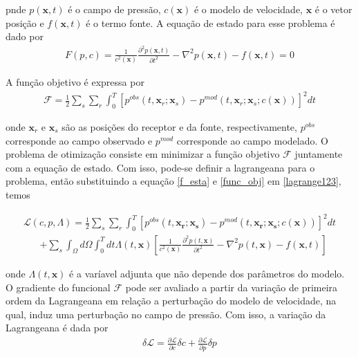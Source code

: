 pnde $p(\mathbf{x},t)$ é o campo de pressão, $c(\mathbf{x})$ é o modelo de velocidade, $\mathbf{x}$ é o vetor posição e $f(\mathbf{x},t)$ é o termo fonte. A equação de estado para esse problema é dado por 
\begin{eqnarray}
\label{f_esta}
 F(p,c) = \frac{1}{c^{2}(\mathbf{x})} \frac{\partial ^{2} p(\mathbf{x},t)}{\partial t^{2}} - \nabla^{2} p(\mathbf{x},t) - f(\mathbf{x},t) = 0
\end{eqnarray}


A função objetivo é expressa por 
\begin{eqnarray}
  \mathcal{F} = \frac{1}{2} \sum_{s} \sum_{r} \int_{0}^{T} \left[ p^{obs} (t,\mathbf{x}_{r};\mathbf{x}_{s}) - p^{mod}(t,\mathbf{x}_{r};\mathbf{x}_{s};c(\mathbf{x})) \right ] ^{2} dt
  \label{func_obj}
\end{eqnarray}

onde $\mathbf{x}_{r}$ e $\mathbf{x}_{s}$ são as posições do receptor e da fonte, respectivamente, $p^{obs}$ corresponde ao campo observado e $p^{mod}$ corresponde ao campo modelado. O problema de otimização consiste em minimizar a função objetivo $\mathcal{F}$ juntamente com a equação de estado. Com isso, pode-se definir a lagrangeana para o problema, então substituindo a equação \ref{f_esta} e \ref{func_obj}  em \ref{lagrange123}, temos

\begin{eqnarray}
\mathcal{L}(c, p, \Lambda)=\frac{1}{2} \sum_{s} \sum_{r} \int_{0}^{T}\left[p^{o b s}\left(t, \mathbf{x}_{\mathbf{r}} ; \mathbf{x}_{\mathbf{s}}\right)-p^{mod}\left(t, \mathbf{x}_{\mathbf{r}} ; \mathbf{x}_{\mathbf{s}} ; c(\mathbf{x})\right)\right]^{2} d t 
\end{eqnarray}
\begin{eqnarray}
\nonumber
&+\sum_{s} \int_{\Omega} d \Omega \int_{0}^{T} d t \Lambda(t, \mathbf{x})\left[\frac{1}{c^{2}(\mathbf{x})} \frac{\partial^{2} p(t, \mathbf{x})}{\partial t^{2}}-\nabla^{2} p(t, \mathbf{x})-f(\mathbf{x},t)\right]
\end{eqnarray}

onde $\Lambda(t,\mathbf{x})$ é a varíavel adjunta que não depende dos parâmetros do modelo. O gradiente do funcional $\mathcal{F}$ pode ser avaliado a partir da variação de primeira ordem da Lagrangeana em relação a perturbação do modelo de velocidade, na qual, induz uma perturbação no campo de pressão. Com isso, a variação da Lagrangeana é dada por 
\begin{eqnarray}
 \delta \mathcal{L} = \frac{\partial \mathcal{L}}{\partial c} \delta c + \frac{\partial \mathcal{L}}{\partial p} \delta p
\end{eqnarray}

